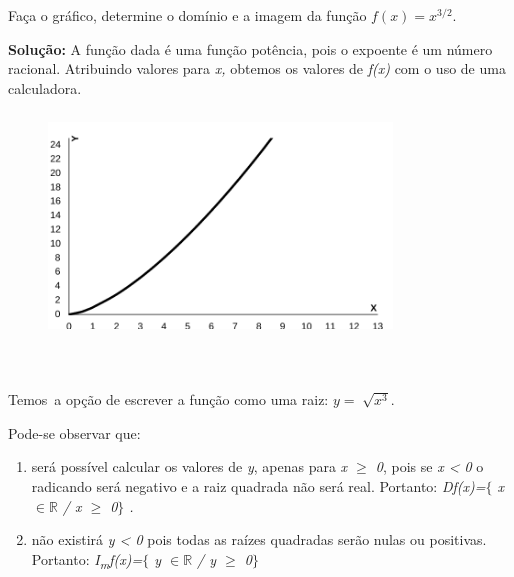 \begin{texemplo}
	
Faça o gráfico, determine o domínio e a imagem da função  \( f \left( x \right) =x^{3/2} \).

\textbf{Solução:} A função dada é uma função potência, pois o expoente é um número racional. Atribuindo valores para \textit{x,} obtemos os valores de \textit{f(x)} com o uso de uma calculadora. 

\begin{figure}[H]
	\begin{Center}
		\includegraphics[width=3.59in,height=2.35in]{capitulos/outras_funcoes/media/image3.pdf}
	\end{Center}
\end{figure}

~~

\quad Temos~a opção de escrever a função como uma raiz:   \( y=\sqrt[]{x^{3}} \).

Pode-se observar que: 

\begin{enumerate}
	\item será possível calcular os valores de \textit{y}, apenas para  \textit{x $ \geq $  0}, pois se \textit{x < 0} o radicando será negativo e a raiz quadrada não será real. Portanto: \textit{Df(x)=$ \{ $  x $ \in \mathbb{R} $ / x $ \geq $  0$ \} $ .}

	\item não existirá \textit{y < 0} pois todas as raízes quadradas serão nulas ou positivas. Portanto: \textit{I\textsubscript{m}f(x)=$ \{ $ y $ \in \mathbb{R} $   / y $ \geq $  0$ \} $  }\qedsymbol{} 
\end{enumerate}
\end{texemplo}

